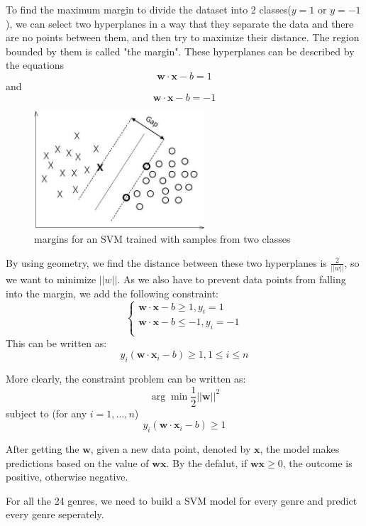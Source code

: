 \documentclass{vldb}
\begin{document}
\par  To find the maximum margin to divide the dataset into 2 classes($y=1$ or $y=-1$), we can select two hyperplanes in a way that they separate the data and there are no points between them, and then try to maximize their distance. The region bounded by them is called "the margin". These hyperplanes can be described by the equations
\begin{displaymath}
\mathbf{w}\cdot\mathbf{x}-b=1
\end{displaymath}
and
\begin{displaymath}
\mathbf{w}\cdot\mathbf{x}-b=-1
\end{displaymath}
\begin{figure}
\begin{center}
\includegraphics[width=2.50in]{SVM.jpeg}
\caption{margins for an SVM trained with samples from two classes}
\end{center}
\end{figure}
\par By using geometry, we find the distance between these two hyperplanes is $\frac{2}{||w||}$, so we want to minimize $||w||$. As we also have to prevent data points from falling into the margin, we add the following constraint:
\begin{displaymath}
\begin{cases}
\mathbf{w}\cdot\mathbf{x}-b\ge1,y_i=1\\
\mathbf{w}\cdot\mathbf{x}-b\le-1,y_i=-1\\
\end{cases}
\end{displaymath}
This can be written as:
\begin{displaymath}
y_i(\mathbf{w}\cdot\mathbf{x}_i-b)\ge1,1\le i \le n
\end{displaymath}
\par More clearly, the constraint problem can be written as:
\begin{displaymath}
\arg\min\frac{1}{2}||\mathbf{w}||^2
\end{displaymath}
subject to (for any $i = 1,...,n$)
\begin{displaymath}
y_i(\mathbf{w}\cdot\mathbf{x}_i-b)\ge1
\end{displaymath}
\par After getting the $\mathbf{w}$, given a new data point, denoted by $\mathbf{x}$, the model makes predictions based on the value of $\mathbf{w}\mathbf{x}$. By the defalut, if $\mathbf{w}\mathbf{x} \ge 0$, the outcome is positive, otherwise negative. 
\par For all the 24 genres, we need to build a SVM model for every genre and predict every genre seperately.
\end{document}
